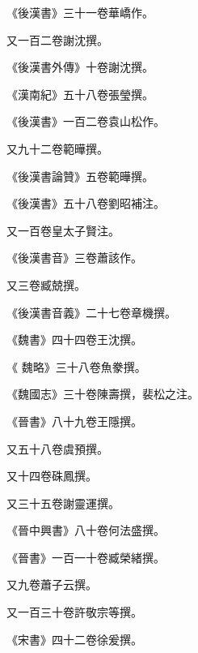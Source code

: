 \begin{pinyinscope}
 《後漢書》三十一卷華嶠作。



 又一百二卷謝沈撰。



 《後漢書外傳》十卷謝沈撰。



 《漢南紀》五十八卷張瑩撰。



 《後漢書》一百二卷袁山松作。



 又九十二卷範曄撰。



 《後漢書論贊》五卷範曄撰。



 《後漢書》五十八卷劉昭補注。



 又一百卷皇太子賢注。



 《後漢書音》三卷蕭該作。



 又三卷臧兢撰。



 《後漢書音義》二十七卷章機撰。



 《魏書》四十四卷王沈撰。



 《
 魏略》三十八卷魚豢撰。



 《魏國志》三十卷陳壽撰，裴松之注。



 《晉書》八十九卷王隱撰。



 又五十八卷虞預撰。



 又十四卷硃鳳撰。



 又三十五卷謝靈運撰。



 《晉中興書》八十卷何法盛撰。



 《晉書》一百一十卷臧榮緒撰。



 又九卷蕭子云撰。



 又一百三十卷許敬宗等撰。



 《宋書》四十二卷徐爰撰。




\end{pinyinscope}
